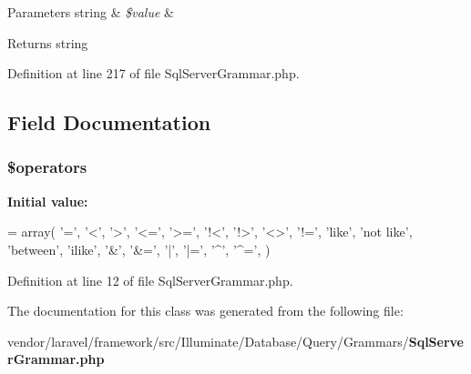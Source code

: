 \begin{DoxyParams}[1]{Parameters}
string & {\em \$value} & \\
\hline
\end{DoxyParams}
\begin{DoxyReturn}{Returns}
string 
\end{DoxyReturn}


Definition at line 217 of file Sql\+Server\+Grammar.\+php.



\subsection{Field Documentation}
\subsubsection[{\$operators}]{\setlength{\rightskip}{0pt plus 5cm}\$operators\hspace{0.3cm}{\ttfamily [protected]}}\label{class_illuminate_1_1_database_1_1_query_1_1_grammars_1_1_sql_server_grammar_a1a526a18e63270ba6814d699637f22bf}
{\bfseries Initial value\+:}
\begin{DoxyCode}
= array(
        \textcolor{charliteral}{'='}, \textcolor{charliteral}{'<'}, \textcolor{charliteral}{'>'}, \textcolor{stringliteral}{'<='}, \textcolor{stringliteral}{'>='}, \textcolor{stringliteral}{'!<'}, \textcolor{stringliteral}{'!>'}, \textcolor{stringliteral}{'<>'}, \textcolor{stringliteral}{'!='},
        \textcolor{stringliteral}{'like'}, \textcolor{stringliteral}{'not like'}, \textcolor{stringliteral}{'between'}, \textcolor{stringliteral}{'ilike'},
        \textcolor{charliteral}{'&'}, \textcolor{stringliteral}{'&='}, \textcolor{charliteral}{'|'}, \textcolor{stringliteral}{'|='}, \textcolor{charliteral}{'^'}, \textcolor{stringliteral}{'^='},
    )
\end{DoxyCode}


Definition at line 12 of file Sql\+Server\+Grammar.\+php.



The documentation for this class was generated from the following file\+:\begin{DoxyCompactItemize}
\item 
vendor/laravel/framework/src/\+Illuminate/\+Database/\+Query/\+Grammars/{\bf Sql\+Server\+Grammar.\+php}\end{DoxyCompactItemize}
